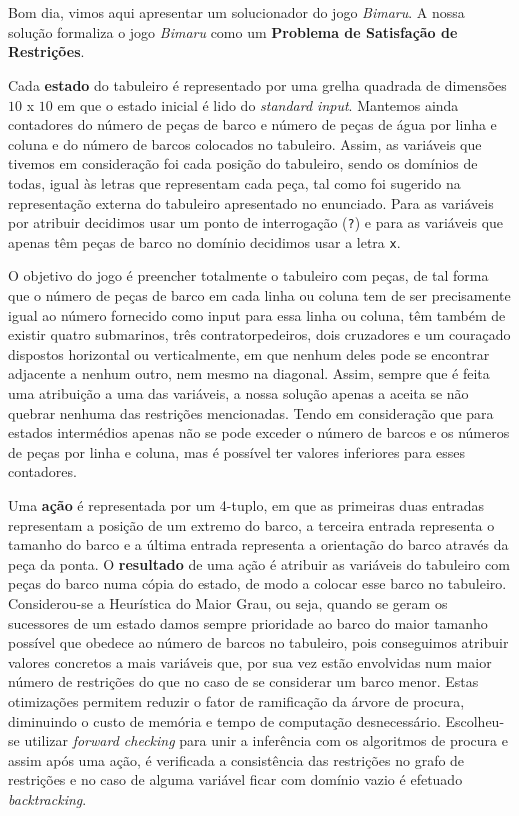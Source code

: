 \documentclass[12pt,a4paper]{article}
\begin{document}
\section*{}
\vspace*{10pt}

Bom dia, vimos aqui apresentar um solucionador do jogo \textit{Bimaru}.
A nossa solução formaliza o jogo \textit{Bimaru} como um \textbf{Problema de Satisfação de Restrições}.

Cada \textbf{estado} do tabuleiro é representado por uma grelha quadrada de dimensões $10$ x $10$ em que
o estado inicial é lido do \textit{standard input}. Mantemos ainda contadores do número de peças de barco e
número de peças de água por linha e coluna e do número de barcos colocados no tabuleiro.
Assim, as variáveis que tivemos em consideração foi cada posição do tabuleiro, sendo os domínios de todas, igual
às letras que representam cada peça, tal como foi sugerido na representação externa do tabuleiro
apresentado no enunciado. Para as variáveis por atribuir decidimos usar um ponto de interrogação (\texttt{?}) e para
as variáveis que apenas têm peças de barco no domínio decidimos usar a letra \texttt{x}.

O objetivo do jogo é preencher totalmente o tabuleiro com peças, de tal forma que o número de peças de barco em cada linha ou coluna tem de ser
precisamente igual ao número fornecido como input para essa linha ou coluna, têm também de existir quatro submarinos, três contratorpedeiros,
dois cruzadores e um couraçado dispostos horizontal ou verticalmente, em que nenhum deles pode se encontrar adjacente a nenhum outro, nem
mesmo na diagonal.
Assim, sempre que é feita uma atribuição a uma das variáveis, a nossa solução apenas a aceita se não quebrar nenhuma das restrições
mencionadas. Tendo em consideração que para estados intermédios apenas não se pode exceder o número de barcos e os números de peças
por linha e coluna, mas é possível ter valores inferiores para esses contadores.

Uma \textbf{ação} é representada por um 4-tuplo, em que as primeiras duas entradas representam a posição de um extremo do barco, a terceira entrada representa o
tamanho do barco e a última entrada representa a orientação do barco através da peça da ponta. O \textbf{resultado} de uma ação é atribuir as variáveis
do tabuleiro com peças do barco numa cópia do estado, de modo a colocar esse barco no tabuleiro.
Considerou-se a Heurística do Maior Grau, ou seja, quando se geram os sucessores de um estado damos sempre prioridade ao barco do maior tamanho possível
que obedece ao número de barcos no tabuleiro, pois conseguimos atribuir valores concretos a mais variáveis que, por sua vez estão envolvidas
num maior número de restrições do que no caso de se considerar um barco menor.
Estas otimizações permitem reduzir o fator de ramificação da árvore de procura, diminuindo o custo de memória e tempo de computação desnecessário.
Escolheu-se utilizar \textit{forward checking} para unir a inferência com os algoritmos de procura e assim após uma ação, é verificada a consistência das restrições
no grafo de restrições e no caso de alguma variável ficar com domínio vazio é efetuado \textit{backtracking}.
\end{document}
